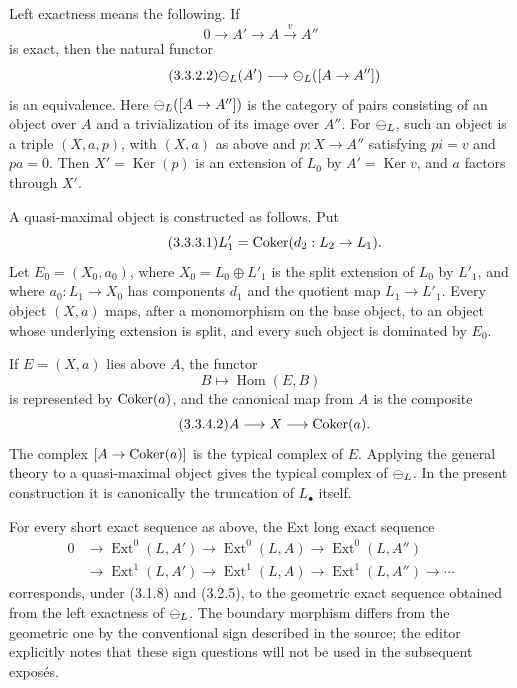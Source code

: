 \documentclass[11pt]{article}
\providecommand{\Ker}{\operatorname{Ker}}
\providecommand{\Hom}{\operatorname{Hom}}
\providecommand{\Ext}{\operatorname{Ext}}
\begin{document}
Left exactness means the following.  If
\begin{equation}\tag{3.3.2.1}
  0\longrightarrow A'\longrightarrow A\xrightarrow{v}A''
\end{equation}
is exact, then the natural functor
\begin{equation}\tag{3.3.2.2}
  \mathcal\Psi_L(A')\longrightarrow \mathcal\Psi_L([A\to A''])
\end{equation}
is an equivalence.  Here \(\mathcal\Psi_L([A\to A''])\) is the category of pairs consisting of an object over \(A\) and a trivialization of its image over \(A''\).  For \(\mathcal\Psi_L\), such an object is a triple \((X,a,p)\), with \((X,a)\) as above and \(p:X\to A''\) satisfying \(p i=v\) and \(p a=0\).  Then \(X'=\Ker(p)\) is an extension of \(L_0\) by \(A'=\Ker v\), and \(a\) factors through \(X'\).

A quasi-maximal object is constructed as follows.  Put
\begin{equation}\tag{3.3.3.1}
  L'_1=\operatorname{Coker}(d_2:L_2\to L_1).
\end{equation}
Let \(E_0=(X_0,a_0)\), where \(X_0=L_0\oplus L'_1\) is the split extension of \(L_0\) by \(L'_1\), and where \(a_0:L_1\to X_0\) has components \(d_1\) and the quotient map \(L_1\to L'_1\).  Every object \((X,a)\) maps, after a monomorphism on the base object, to an object whose underlying extension is split, and every such object is dominated by \(E_0\).

If \(E=(X,a)\) lies above \(A\), the functor
\begin{equation}\tag{3.3.4.1}
  B\longmapsto \Hom(E,B)
\end{equation}
is represented by \(\operatorname{Coker}(a)\), and the canonical map from \(A\) is the composite
\begin{equation}\tag{3.3.4.2}
  A\longrightarrow X\longrightarrow \operatorname{Coker}(a).
\end{equation}
The complex \([A\to\operatorname{Coker}(a)]\) is the typical complex of \(E\).  Applying the general theory to a quasi-maximal object gives the typical complex of \(\mathcal\Psi_L\).  In the present construction it is canonically the truncation of \(L_\bullet\) itself.

For every short exact sequence as above, the Ext long exact sequence
\begin{equation}\tag{3.3.6.1}
\begin{aligned}
0&\to\Ext^0(L,A')\to\Ext^0(L,A)\to\Ext^0(L,A'')\\
 &\to\Ext^1(L,A')\to\Ext^1(L,A)\to\Ext^1(L,A'')\to\cdots
\end{aligned}
\end{equation}
corresponds, under (3.1.8) and (3.2.5), to the geometric exact sequence obtained from the left exactness of \(\mathcal\Psi_L\).  The boundary morphism differs from the geometric one by the conventional sign described in the source; the editor explicitly notes that these sign questions will not be used in the subsequent expos\'es.
\end{document}
